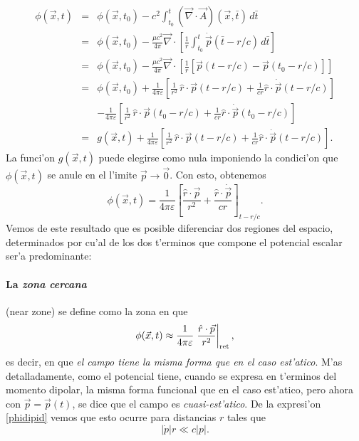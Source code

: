 \begin{eqnarray}
\phi(\vec{x},t)&=&\phi(\vec{x},t_0)-c^2\int_{t_0}^t(\vec{\nabla}\cdot\vec{A})(\vec{x},\bar{t})\,d\bar{t} \\
&=&\phi(\vec{x},t_0)-\frac{\mu c^2}{4\pi} \vec{\nabla}\cdot\left[\frac{1}{r}\int_{t_0}^t\dot{\vec{p}}(\bar{t}-{r}/{c})\,d\bar{t}\right] \\
&=&\phi(\vec{x},t_0)-\frac{\mu c^2}{4\pi} \vec{\nabla}\cdot\left[\frac{1}{r}\left[\vec{p}(t-{r}/{c})-\vec{p}(t_0-{r}/{c})\right]\right] \\
&=&\phi(\vec{x},t_0)+\frac{1}{4\pi\varepsilon}\left[\frac{1}{r^2}\,\hat{r}\cdot\vec{p}(t-{r}/{c})+\frac{1}{cr}\hat{r}\cdot\dot{\vec{p}}(t-{r}/{c})\right] \nonumber\\
&& -\frac{1}{4\pi\varepsilon}\left[\frac{1}{r^2}\,\hat{r}\cdot\vec{p}(t_0-{r}/{c})+\frac{1}{cr}\hat{r}\cdot\dot{\vec{p}}(t_0-{r}/{c})\right] \\
&=& g(\vec{x},t)+\frac{1}{4\pi\varepsilon}\left[\frac{1}{r^2}\,\hat{r}\cdot\vec{p}(t-{r}/{c})+\frac{1}{cr}\hat{r}\cdot\dot{\vec{p}}(t-{r}/{c})\right] .
\end{eqnarray}
La funci'on $g(\vec{x},t)$ puede elegirse como nula imponiendo la condici'on que $\phi(\vec{x},t)$ se anule en el l'imite $\vec{p}\to\vec{0}$. Con esto, obtenemos 
\begin{equation}
\boxed{\phi(\vec{x},t)=\frac{1}{4\pi\varepsilon}\left[\frac{\hat{r}\cdot\vec{p}}{r^2}+\frac{\hat{r}\cdot\dot{\vec{p}}}{cr}\right]_{t-{r}/{c}}.} \label{phidipid}
\end{equation}
Vemos de este resultado que es posible diferenciar dos regiones del espacio, determinados por cu'al de los dos t'erminos que compone el potencial escalar ser'a predominante:

\paragraph{La \textit{zona cercana}} (near zone) se define como la zona en que
\begin{equation}
\phi(\vec{x},t)\approx\frac{1}{4\pi\varepsilon}\left.\frac{\hat{r}\cdot\vec{p}}{r^2}\right|_{\rm ret},
\end{equation}
es decir, en que \textit{el campo tiene la misma forma que en el caso est'atico}. M'as detalladamente, como el potencial tiene, cuando se expresa en t'erminos del momento dipolar, la misma forma funcional que en el caso est'atico, pero ahora con $\vec{p}=\vec{p}(t)$, se dice que el campo es \textit{cuasi-est'atico}. De la expresi'on \eqref{phidipid} vemos que esto ocurre para distancias $r$ tales que
\begin{equation}
|\dot{p}|r\ll c|p|.
\end{equation}

